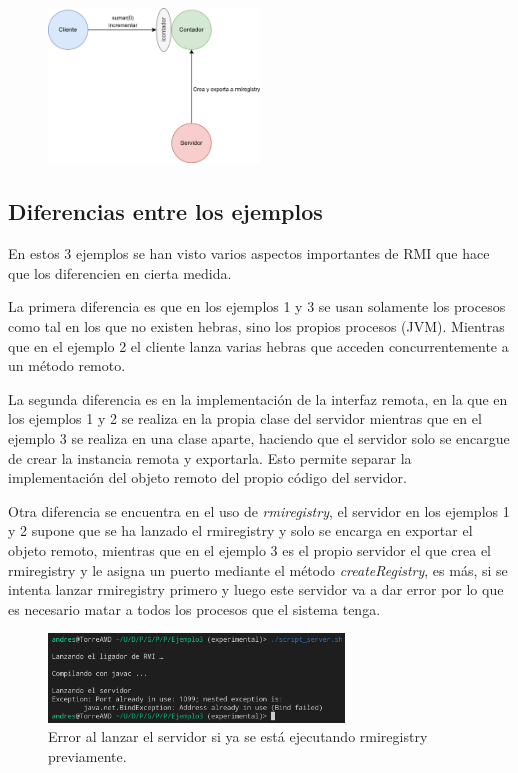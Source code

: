 \documentclass{article}
\begin{document}
\begin{figure}[H]
    \centering
    \includegraphics[width=0.5\textwidth]{imagenes/E3Diagrama.png}
\end{figure}

\subsection{Diferencias entre los ejemplos}
En estos 3 ejemplos se han visto varios aspectos importantes de RMI que hace que los diferencien en cierta medida. 

\bigskip

La primera diferencia es que en los ejemplos 1 y 3 se usan solamente los procesos como tal en los que no existen hebras, sino los propios procesos (JVM). Mientras que en el ejemplo 2 el cliente lanza varias hebras que acceden concurrentemente a un método remoto.

\bigskip

La segunda diferencia es en la implementación de la interfaz remota, en la que en los ejemplos 1 y 2 se realiza en la propia clase del servidor mientras que en el ejemplo 3 se realiza en una clase aparte, haciendo que el servidor solo se encargue de crear la instancia remota y exportarla. Esto permite separar la implementación del objeto remoto del propio código del servidor.

\bigskip

Otra diferencia se encuentra en el uso de \textit{rmiregistry}, el servidor en los ejemplos 1 y 2 supone que se ha lanzado el rmiregistry y solo se encarga en exportar el objeto remoto, mientras que en el ejemplo 3 es el propio servidor el que crea el rmiregistry y le asigna un puerto mediante el método \textit{createRegistry}, es más, si se intenta lanzar rmiregistry primero y luego este servidor va a dar error por lo que es necesario matar a todos los procesos que el sistema tenga.

\begin{figure}[H]
    \centering
    \includegraphics[width=0.7\textwidth]{imagenes/E3Error.png}
    \caption{Error al lanzar el servidor si ya se está ejecutando rmiregistry previamente.}
\end{figure}
\end{document}
